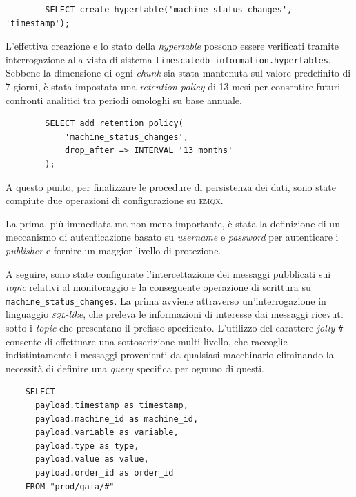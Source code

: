 \documentclass[12pt]{article}
\begin{document}
    \begin{verbatim}
        SELECT create_hypertable('machine_status_changes', 'timestamp');
    \end{verbatim}
    
    L'effettiva creazione e lo stato della \textit{hypertable} possono essere verificati tramite interrogazione alla vista di sistema \verb|timescaledb_information.hypertables|. Sebbene la dimensione di ogni \textit{chunk} sia stata mantenuta sul valore predefinito di 7 giorni, è stata impostata una \textit{retention policy} di 13 mesi per consentire futuri confronti analitici tra periodi omologhi su base annuale. \newline

    \begin{verbatim}
        SELECT add_retention_policy(
            'machine_status_changes',
            drop_after => INTERVAL '13 months'
        );
    \end{verbatim}

    A questo punto, per finalizzare le procedure di persistenza dei dati, sono state compiute due operazioni di configurazione su \textsc{emqx}.

    La prima, più immediata ma non meno importante, è stata la definizione di un meccanismo di autenticazione basato su \textit{username} e \textit{password} per autenticare i \textit{publisher} e fornire un maggior livello di protezione.
    
    A seguire, sono state configurate l'intercettazione dei messaggi pubblicati sui \textit{topic} relativi al monitoraggio e la conseguente operazione di scrittura su \verb|machine_status_changes|.
    La prima avviene attraverso un'interrogazione in linguaggio \textit{\textsc{sql}-like}, che preleva le informazioni di interesse dai messaggi ricevuti sotto i \textit{topic} che presentano il prefisso specificato. L'utilizzo del carattere \textit{jolly} \verb|#| consente di effettuare una sottoscrizione multi-livello, che raccoglie indistintamente i messaggi provenienti da qualsiasi macchinario eliminando la necessità di definire una \textit{query} specifica per ognuno di questi.
    
    \begin{verbatim}
    SELECT 
      payload.timestamp as timestamp,
      payload.machine_id as machine_id,
      payload.variable as variable, 
      payload.type as type,
      payload.value as value, 
      payload.order_id as order_id
    FROM "prod/gaia/#"
    \end{verbatim}
    
\end{document}

